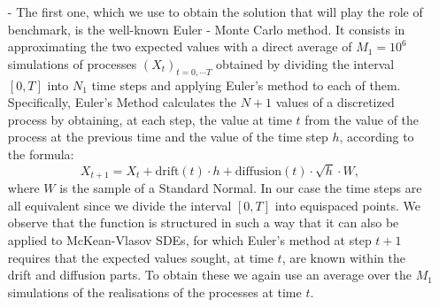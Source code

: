 \documentclass[a4paper,11pt,openright]{report}
\begin{document}
\begin{itemize}
\item[-] The first one, which we use to obtain the solution that will play the role of benchmark, is the well-known Euler - Monte Carlo method. It consists in approximating the two expected values with a direct average of $M_1 = 10^6$ simulations of processes $(X_t)_{t=0, \cdots T}$ obtained by dividing the interval $[0,T]$ into $N_1$ time steps and applying Euler's method to each of them. Specifically, Euler's Method calculates the $N+1$ values of a discretized process by obtaining, at each step, the value at time $t$ from the value of the process at the previous time and the value of the time step $h$, according to the formula:
\[
X_{t+1} = X_t + \mathrm{drift}(t) \cdot h + \mathrm{diffusion}(t) \cdot \sqrt{h} \cdot W, 
\]
where $W$ is the sample of a Standard Normal. In our case the time steps are all equivalent since we divide the interval $[0,T]$ into equispaced points. We observe that the function is structured in such a way that it can also be applied to McKean-Vlasov SDEs, for which Euler's method at step $t+1$ requires that the expected values sought, at time $t$, are known within the drift and diffusion parts. To obtain these we again use an average over the $M_1$ simulations of the realisations of the processes at time $t$.


\end{itemize}
\end{document}
